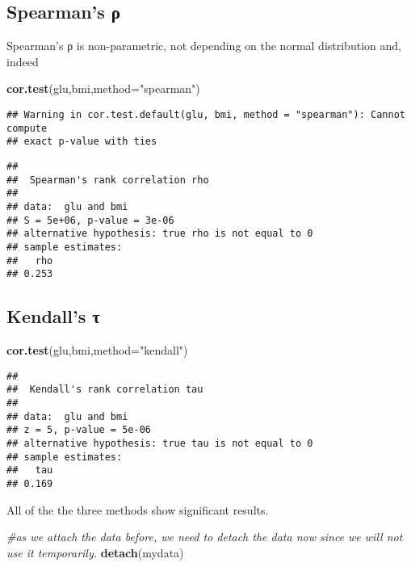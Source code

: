 \documentclass[]{book}
\newenvironment{Shaded}{\begin{snugshade}}{\end{snugshade}}
\newcommand{\KeywordTok}[1]{\textcolor[rgb]{0.13,0.29,0.53}{\textbf{#1}}}
\newcommand{\DataTypeTok}[1]{\textcolor[rgb]{0.13,0.29,0.53}{#1}}
\newcommand{\StringTok}[1]{\textcolor[rgb]{0.31,0.60,0.02}{#1}}
\newcommand{\CommentTok}[1]{\textcolor[rgb]{0.56,0.35,0.01}{\textit{#1}}}
\newcommand{\NormalTok}[1]{#1}
\theoremstyle{definition}
\theoremstyle{definition}
\theoremstyle{definition}
\theoremstyle{remark}
\begin{document}
\subsection{Spearman's ρ}\label{spearmans-}

Spearman's ρ is non-parametric, not depending on the normal distribution
and, indeed

\begin{Shaded}
\begin{Highlighting}[]
\KeywordTok{cor.test}\NormalTok{(glu,bmi,}\DataTypeTok{method=}\StringTok{"spearman"}\NormalTok{)}
\end{Highlighting}
\end{Shaded}

\begin{verbatim}
## Warning in cor.test.default(glu, bmi, method = "spearman"): Cannot compute
## exact p-value with ties
\end{verbatim}

\begin{verbatim}
## 
##  Spearman's rank correlation rho
## 
## data:  glu and bmi
## S = 5e+06, p-value = 3e-06
## alternative hypothesis: true rho is not equal to 0
## sample estimates:
##   rho 
## 0.253
\end{verbatim}

\subsection{Kendall's τ}\label{kendalls-}

\begin{Shaded}
\begin{Highlighting}[]
\KeywordTok{cor.test}\NormalTok{(glu,bmi,}\DataTypeTok{method=}\StringTok{"kendall"}\NormalTok{)}
\end{Highlighting}
\end{Shaded}

\begin{verbatim}
## 
##  Kendall's rank correlation tau
## 
## data:  glu and bmi
## z = 5, p-value = 5e-06
## alternative hypothesis: true tau is not equal to 0
## sample estimates:
##   tau 
## 0.169
\end{verbatim}

All of the the three methods show significant results.

\begin{Shaded}
\begin{Highlighting}[]
\CommentTok{#as we attach the data before, we need to detach the data now since we will not use it temporarily.}
\KeywordTok{detach}\NormalTok{(mydata)}
\end{Highlighting}
\end{Shaded}
\end{document}

